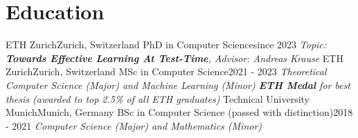 \documentclass[a4paper,20pt]{article}
\begin{document}


\vspace{-5pt}
\section{Education}
  \resumeSubHeadingListStart
    \resumeSubheading
      {ETH Zurich}{Zurich, Switzerland}
      {PhD in Computer Science}{since 2023}
      {\scriptsize \textit{ \footnotesize{\newline Topic: \textbf{Towards Effective Learning At Test-Time}, Advisor: Andreas Krause}}}
    \resumeSubHeadingListEnd
  \vspace{-10pt}
    \resumeSubHeadingListStart
      \resumeSubheading
        {ETH Zurich}{Zurich, Switzerland}
        {MSc in Computer Science}{2021 - 2023}
        {\scriptsize \textit{ \footnotesize{\newline{}Theoretical Computer Science (Major) and Machine Learning (Minor)}
        \newline \textbf{ETH Medal} for best thesis (awarded to top 2.5\% of all ETH graduates)}}
      \resumeSubHeadingListEnd
  \vspace{-10pt}
    \resumeSubHeadingListStart
      \resumeSubheading
        {Technical University Munich}{Munich, Germany}
        {BSc in Computer Science (passed with distinction)}{2018 - 2021}
        {\scriptsize \textit{ \footnotesize{\newline{}Computer Science (Major) and Mathematics (Minor)}}}
      \resumeSubHeadingListEnd
\end{document}
